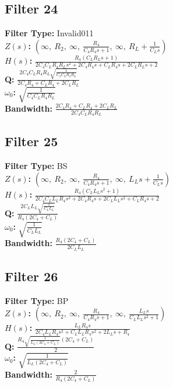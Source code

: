 \documentclass{article}
\begin{document}
\subsection*{Filter 24}
\textbf{Filter Type:} Invalid011 \\ 
\textbf{$Z(s)$:} $\left( \infty, \  R_{2}, \  \infty, \  \frac{R_{4}}{C_{4} R_{4} s + 1}, \  \infty, \  R_{L} + \frac{1}{C_{L} s}\right)$ \\ 
\textbf{$H(s)$:} $\frac{R_{4} \left(C_{L} R_{L} s + 1\right)}{2 C_{4} C_{L} R_{4} R_{L} s^{2} + 2 C_{4} R_{4} s + C_{L} R_{4} s + 2 C_{L} R_{L} s + 2}$ \\ 
\textbf{Q:} $\frac{2 C_{4} C_{L} R_{4} R_{L} \sqrt{\frac{1}{C_{4} C_{L} R_{4} R_{L}}}}{2 C_{4} R_{4} + C_{L} R_{4} + 2 C_{L} R_{L}}$ \\ 
\textbf{$\omega_0$:} $\sqrt{\frac{1}{C_{4} C_{L} R_{4} R_{L}}}$ \\ 
\textbf{Bandwidth:} $\frac{2 C_{4} R_{4} + C_{L} R_{4} + 2 C_{L} R_{L}}{2 C_{4} C_{L} R_{4} R_{L}}$ \\ 
\subsection*{Filter 25}
\textbf{Filter Type:} BS \\ 
\textbf{$Z(s)$:} $\left( \infty, \  R_{2}, \  \infty, \  \frac{R_{4}}{C_{4} R_{4} s + 1}, \  \infty, \  L_{L} s + \frac{1}{C_{L} s}\right)$ \\ 
\textbf{$H(s)$:} $\frac{R_{4} \left(C_{L} L_{L} s^{2} + 1\right)}{2 C_{4} C_{L} L_{L} R_{4} s^{3} + 2 C_{4} R_{4} s + 2 C_{L} L_{L} s^{2} + C_{L} R_{4} s + 2}$ \\ 
\textbf{Q:} $\frac{2 C_{L} L_{L} \sqrt{\frac{1}{C_{L} L_{L}}}}{R_{4} \left(2 C_{4} + C_{L}\right)}$ \\ 
\textbf{$\omega_0$:} $\sqrt{\frac{1}{C_{L} L_{L}}}$ \\ 
\textbf{Bandwidth:} $\frac{R_{4} \left(2 C_{4} + C_{L}\right)}{2 C_{L} L_{L}}$ \\ 
\subsection*{Filter 26}
\textbf{Filter Type:} BP \\ 
\textbf{$Z(s)$:} $\left( \infty, \  R_{2}, \  \infty, \  \frac{R_{4}}{C_{4} R_{4} s + 1}, \  \infty, \  \frac{L_{L} s}{C_{L} L_{L} s^{2} + 1}\right)$ \\ 
\textbf{$H(s)$:} $\frac{L_{L} R_{4} s}{2 C_{4} L_{L} R_{4} s^{2} + C_{L} L_{L} R_{4} s^{2} + 2 L_{L} s + R_{4}}$ \\ 
\textbf{Q:} $\frac{R_{4} \sqrt{\frac{1}{L_{L} \left(2 C_{4} + C_{L}\right)}} \left(2 C_{4} + C_{L}\right)}{2}$ \\ 
\textbf{$\omega_0$:} $\sqrt{\frac{1}{L_{L} \left(2 C_{4} + C_{L}\right)}}$ \\ 
\textbf{Bandwidth:} $\frac{2}{R_{4} \left(2 C_{4} + C_{L}\right)}$ \\ 
\end{document}
